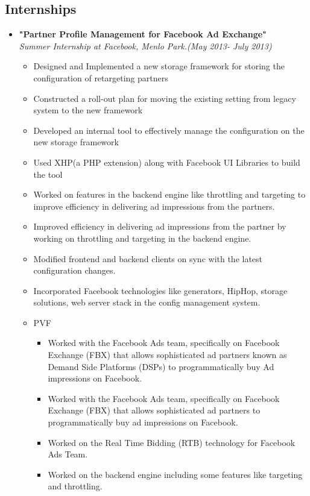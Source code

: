 \documentclass[margin,line]{resume}
\begin{document}
\begin{resume}
  \section{\mysidestyle Internships}
  \begin{itemize}
  \item \large{\textbf{\textsf{"Partner Profile Management for Facebook Ad Exchange"}}}
    \\ \small{\textit{Summer Internship at Facebook, Menlo Park.(May 2013- July 2013)}}
    \normalsize
    \begin{itemize}
    \item Designed and Implemented a new storage framework for storing the configuration of retargeting partners
    \item Constructed a roll-out plan for moving the existing setting from legacy system to the new framework
    \item Developed an internal tool to effectively manage the configuration on the new storage framework
    \item Used XHP(a PHP extension) along with Facebook UI Libraries to build the tool
    \item Worked on features in the backend engine like throttling and targeting to improve efficiency in delivering ad impressions from the partners.
    \item Improved efficiency in delivering ad impressions from the partner by working on throttling and targeting in the
      backend engine.
    \item Modified frontend and backend clients on sync with the latest configuration changes.
    \item Incorporated Facebook technologies like generators, HipHop, storage solutions, web server stack in the config management system.
      \newpage
    \item PVF
      \begin{itemize}
      \item Worked with the Facebook Ads team, specifically on Facebook Exchange (FBX) that allows sophisticated ad partners known as Demand Side Platforms (DSPs) to programmatically buy Ad impressions on Facebook.
      \item Worked with the Facebook Ads team, specifically on Facebook Exchange (FBX) that allows sophisticated ad partners to programmatically buy ad impressions on Facebook.
      \item Worked on the Real Time Bidding (RTB) technology for Facebook Ads Team.
      \item Worked on the backend engine including some features like targeting and throttling.

\end{itemize}
\end{itemize}
\end{itemize}
\end{resume}
\end{document}
